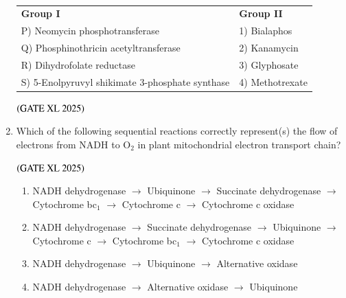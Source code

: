 \documentclass[journal]{IEEEtran}
\begin{document}
\begin{enumerate}
    \begin{table}[H]
        \centering
        \begin{tabular}{ll}
            \textbf{Group I} & \textbf{Group II} \\
            P) Neomycin phosphotransferase & 1) Bialaphos \\
            Q) Phosphinothricin acetyltransferase & 2) Kanamycin \\
            R) Dihydrofolate reductase & 3) Glyphosate \\
            S) 5-Enolpyruvyl shikimate 3-phosphate synthase & 4) Methotrexate \\
        \end{tabular}
        \caption*{}
        \label{tab:xl2025_q61}
    \end{table}

    \hfill $\left(\text{GATE XL 2025}\right)$
    \begin{enumerate}
    \end{enumerate}

    \item Which of the following sequential reactions correctly represent(s) the flow of electrons from NADH to O$_2$ in plant mitochondrial electron transport chain?

    \hfill $\left(\text{GATE XL 2025}\right)$
    \begin{enumerate}
        \item NADH dehydrogenase $\rightarrow$ Ubiquinone $\rightarrow$ Succinate dehydrogenase $\rightarrow$ Cytochrome bc$_1$ $\rightarrow$ Cytochrome c $\rightarrow$ Cytochrome c oxidase
        \item NADH dehydrogenase $\rightarrow$ Succinate dehydrogenase $\rightarrow$ Ubiquinone $\rightarrow$ Cytochrome c $\rightarrow$ Cytochrome bc$_1$ $\rightarrow$ Cytochrome c oxidase
        \item NADH dehydrogenase $\rightarrow$ Ubiquinone $\rightarrow$ Alternative oxidase
        \item NADH dehydrogenase $\rightarrow$ Alternative oxidase $\rightarrow$ Ubiquinone
    \end{enumerate}


\end{enumerate}
\end{document}
